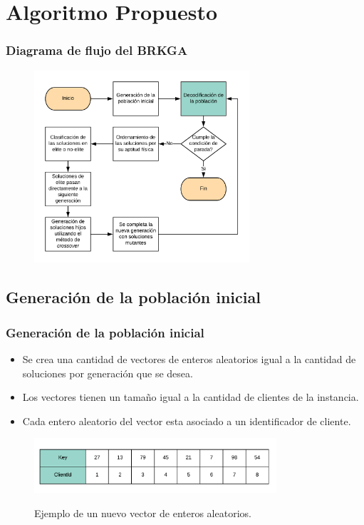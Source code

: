 \documentclass{beamer}
\begin{document}

\section{Algoritmo Propuesto}

\begin{frame}
\frametitle{Diagrama de flujo del BRKGA}

\begin{figure}[h]
	\centering
	\includegraphics[width=8cm]{BRKGA_Flow_Chart_Base}
	\label{fig:BRKGA_Flow_Chart_Base}
\end{figure}

\end{frame}


\subsection{Generación de la población inicial}

\begin{frame}
\frametitle{Generación de la población inicial}

\begin{itemize}
    \item Se crea una cantidad de vectores de enteros aleatorios igual a la cantidad de soluciones por generación que se desea.
    \pause
    \item Los vectores tienen un tamaño igual a la cantidad de clientes de la instancia.
    \pause
    \item Cada entero aleatorio del vector esta asociado a un identificador de cliente.
    \pause
\end{itemize}

\begin{figure}[h]
	\caption{Ejemplo de un nuevo vector de enteros aleatorios.}
	\centering
	\includegraphics[width=9cm]{RandomKeysInicializado}
	\label{fig:RandomKeysInicializado}
\end{figure}

\end{frame}
\end{document}
